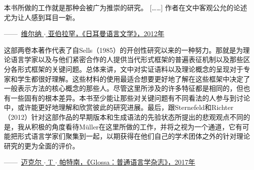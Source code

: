 {\smallskip

\noindent
本书所做的工作就是那种会被广为推崇的研究。 [……] 作者在文中客观公允的论述尤为让人感到耳目一新。
 \begin{flushright}
——\, \href{http://dx.doi.org/10.1515/germ-2011-537}{维尔纳 $\cdot$ 亚伯拉罕，《日耳曼语言文学》，2012年}
\end{flushright}

\smallskip

\noindent
这部两卷本著作代表了自Sells（1985）的开创性研究以来的一种努力。那就是为理论语言学家以及与他们紧密合作的人提供当代形式框架的普遍表征机制以及那些区分各形式框架的关键问题。总体来讲，文中对实证语料以及理论概念的呈现对于专家和学生都很好理解。这些材料的使用最适合想要更好地了解在这些框架中决定了一般表示方法的核心概念的那些人。尽管这里所涉及的许多特征都是相同的，但也有一些固有的根本差异。本书至少能让那些对关键问题有不同看法的人参与到讨论中，或许能更好地理解和欣赏彼此的研究进展。最后，跟Sternefeld和Richter（2012）针对这部作品的早期版本和生成语法的先验状态所提出的悲观观点不同的是，我从积极的角度看待Müller在这里所做的工作，并将之视为一个通道，它有可能把形式语言学家们聚集到一起，以期获得在他们自己的学术团体之外的针对理论研究的更为全面的评价。
\begin{flushright}
——\, \href{http://doi.org/10.5334/gjgl.414}{迈克尔 $\cdot$ T $\cdot$  帕特南，《Glossa：普通语言学杂志》，2017年}
\end{flushright}


}
